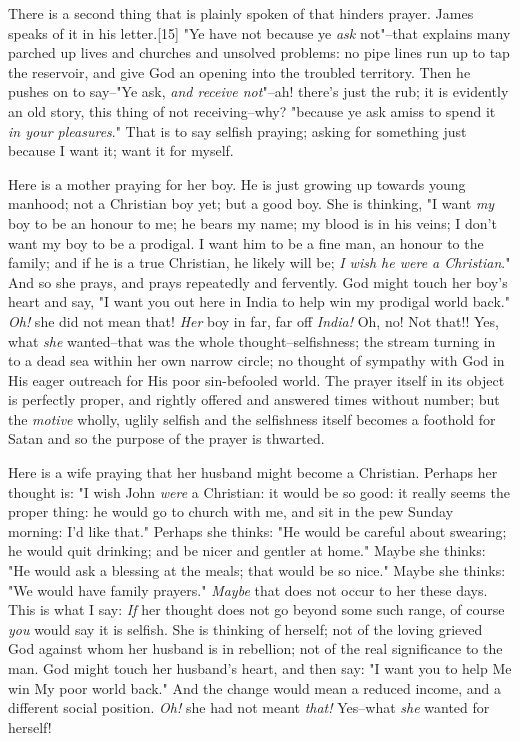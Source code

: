 There is a second thing that is plainly spoken of that hinders prayer.
James speaks of it in his letter.[15] "Ye have not because ye \textit{ask}
not"--that explains many parched up lives and churches and unsolved
problems: no pipe lines run up to tap the reservoir, and give God an
opening into the troubled territory. Then he pushes on to say--"Ye ask,
\textit{and receive not}"--ah! there's just the rub; it is evidently an old
story, this thing of not receiving--why? "because ye ask amiss to spend it
\textit{in your pleasures}." That is to say selfish praying; asking for something
just because I want it; want it for myself.

Here is a mother praying for her boy. He is just growing up towards young
manhood; not a Christian boy yet; but a good boy. She is thinking, "I want
\textit{my} boy to be an honour to me; he bears my name; my blood is in his
veins; I don't want my boy to be a prodigal. I want him to be a fine man,
an honour to the family; and if he is a true Christian, he likely will be;
\textit{I wish he were a Christian}." And so she prays, and prays repeatedly and
fervently. God might touch her boy's heart and say, "I want you out here
in India to help win my prodigal world back." \textit{Oh!} she did not mean that!
\textit{Her} boy in far, far off \textit{India!} Oh, no! Not that!! Yes, what \textit{she}
wanted--that was the whole thought--selfishness; the stream turning in to
a dead sea within her own narrow circle; no thought of sympathy with God
in His eager outreach for His poor sin-befooled world. The prayer itself
in its object is perfectly proper, and rightly offered and answered times
without number; but the \textit{motive} wholly, uglily selfish and the
selfishness itself becomes a foothold for Satan and so the purpose of the
prayer is thwarted.

Here is a wife praying that her husband might become a Christian. Perhaps
her thought is: "I wish John \textit{were} a Christian: it would be so good: it
really seems the proper thing: he would go to church with me, and sit in
the pew Sunday morning: I'd like that." Perhaps she thinks: "He would be
careful about swearing; he would quit drinking; and be nicer and gentler
at home." Maybe she thinks: "He would ask a blessing at the meals; that
would be so nice." Maybe she thinks: "We would have family prayers."
\textit{Maybe} that does not occur to her these days. This is what I say: \textit{If}
her thought does not go beyond some such range, of course \textit{you} would say
it is selfish. She is thinking of herself; not of the loving grieved God
against whom her husband is in rebellion; not of the real significance to
the man. God might touch her husband's heart, and then say: "I want you to
help Me win My poor world back." And the change would mean a reduced
income, and a different social position. \textit{Oh!} she had not meant \textit{that!}
Yes--what \textit{she} wanted for herself!

